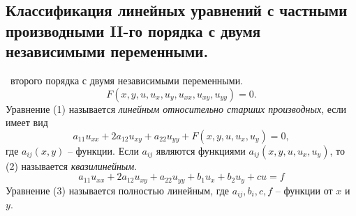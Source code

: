 \documentclass[9pt]{article}
\begin{document}
\subsection{Классификация линейных уравнений с частными производными II-го порядка с двумя независимыми переменными.}

\ 
 второго порядка с двумя независимыми переменными.
\begin{equation}
    F(x,y,u,u_x,u_y,u_{xx},u_{xy},u_{yy})=0.
\end{equation}
Уравнение (1) называется \textit{линейным относительно старших производных}, если имеет вид
\begin{equation}
    a_{11}u_{xx}+2a_{12}u_{xy}+a_{22}u_{yy}+F(x,y,u,u_x,u_y)=0,
\end{equation}
где \(a_{ij}(x,y)\) -- функции. Если \(a_{ij}\) являются функциями \(a_{ij}(x,y,u,u_x,u_y)\), то (2) называется \textit{квазилинейным}.
\begin{equation}
    a_{11}u_{xx}+2a_{12}u_{xy}+a_{22}u_{yy}+b_1u_x+b_2u_y+cu=f
\end{equation}
Уравнение (3) называется полностью линейным, где \(a_{ij},b_i,c,f\) -- функции от \(x\) и \(y\).
\end{document}
